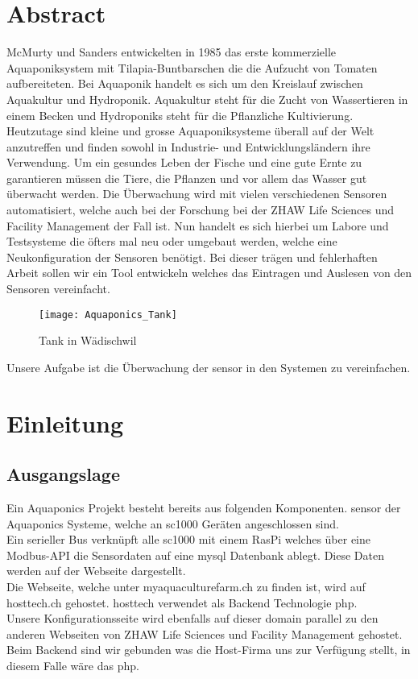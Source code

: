 \documentclass[../main.tex]{subfiles}
\begin{document}
	\section{Abstract}
	McMurty und Sanders entwickelten in 1985 das erste kommerzielle Aquaponiksystem mit Tilapia-Buntbarschen die die Aufzucht von Tomaten aufbereiteten. Bei Aquaponik handelt es sich um den Kreislauf zwischen Aquakultur und Hydroponik. Aquakultur steht für die Zucht von Wassertieren in einem Becken und Hydroponiks steht für die Pflanzliche Kultivierung. Heutzutage sind kleine und grosse Aquaponiksysteme überall auf der Welt anzutreffen und finden sowohl in Industrie- und Entwicklungsländern ihre Verwendung. Um ein gesundes Leben der Fische und eine gute Ernte zu garantieren müssen die Tiere, die Pflanzen und vor allem das Wasser gut überwacht werden. Die Überwachung wird mit vielen verschiedenen Sensoren automatisiert, welche auch bei der Forschung bei der ZHAW Life Sciences und Facility Management der Fall ist. Nun handelt es sich hierbei um Labore und Testsysteme die öfters mal neu oder umgebaut werden, welche eine Neukonfiguration der Sensoren benötigt. Bei dieser trägen und fehlerhaften Arbeit sollen wir ein Tool entwickeln welches das Eintragen und Auslesen von den Sensoren vereinfacht.\\
	
	
	\begin{figure}[H]
		\centering
		\texttt{[image: Aquaponics\_Tank]}
		\caption{Tank in Wädischwil}
		\label{fig:Aquaponics_Tank}
	\end{figure}
	\par \noindent
	Unsere Aufgabe ist die Überwachung der \gls{sensor} in den Systemen zu vereinfachen. \\
	
	\section{Einleitung}
	
	\subsection{Ausgangslage}
	Ein Aquaponics Projekt besteht bereits aus folgenden Komponenten. \gls{sensor} der Aquaponics Systeme, welche an \gls{sc1000} Geräten angeschlossen sind. \\
	Ein serieller Bus verknüpft alle \gls{sc1000} mit einem RasPi welches über eine Modbus-API die Sensordaten auf eine \gls{mysql} Datenbank ablegt. Diese Daten werden auf der Webseite dargestellt. \\
	Die Webseite, welche unter myaquaculturefarm.ch zu finden ist, wird auf hosttech.ch gehostet. \gls{hosttech} verwendet als Backend Technologie \gls{php}.\\
	Unsere Konfigurationsseite wird ebenfalls auf dieser \gls{domain} parallel zu den anderen Webseiten von ZHAW Life Sciences und Facility Management gehostet. \\
	Beim Backend sind wir gebunden was die Host-Firma uns zur Verfügung stellt, in diesem Falle wäre das \gls{php}.
	
\end{document}
